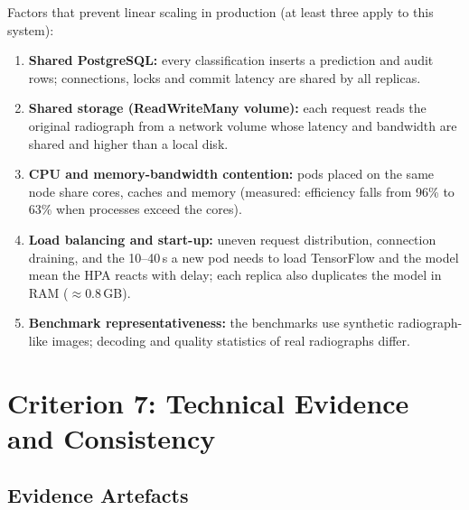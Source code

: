 \documentclass[12pt,a4paper]{article}
\begin{document}
\noindent Factors that prevent linear scaling in production (at least three apply to this system):
\begin{enumerate}[leftmargin=*]
    \item \textbf{Shared PostgreSQL:} every classification inserts a prediction and audit rows; connections, locks and commit latency are shared by all replicas.
    \item \textbf{Shared storage (ReadWriteMany volume):} each request reads the original radiograph from a network volume whose latency and bandwidth are shared and higher than a local disk.
    \item \textbf{CPU and memory-bandwidth contention:} pods placed on the same node share cores, caches and memory (measured: efficiency falls from 96\% to 63\% when processes exceed the cores).
    \item \textbf{Load balancing and start-up:} uneven request distribution, connection draining, and the 10--40\,s a new pod needs to load TensorFlow and the model mean the HPA reacts with delay;
          each replica also duplicates the model in RAM ($\approx$0.8\,GB).
    \item \textbf{Benchmark representativeness:} the benchmarks use synthetic radiograph-like images; decoding and quality statistics of real radiographs differ.
\end{enumerate}

\section{Criterion 7: Technical Evidence and Consistency}
\label{sec:c7}

\subsection{Evidence Artefacts}
\end{document}
